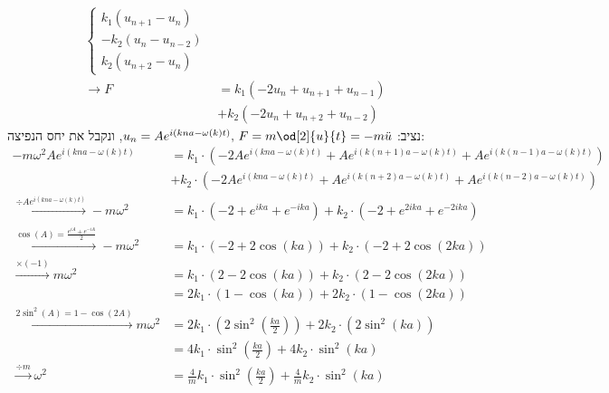 \documentclass{article}
\begin{document}
\begin{Question}
\begin{align*}
\begin{cases}
        k_{1}\left( u_{n+1}-u_{n} \right)\\
        -k_{2}\left( u_{n}-u_{n-2} \right)\\
        k_{2}\left( u_{n+2}-u_{n} \right)
    \end{cases}\\\rightarrow
    F&=
        k_{1} (- 2 u_{n} + u_{n+1} + u_{n-1})\\
        &+k_{2} (- 2 u_{n} + u_{n+2} + u_{n-2})
\end{align*}
נציב: $u_{n}=Ae^{i\left( kna-\omega(k) t \right)},\, F=m\od[2]{u}{t}=-m\ddot{u} $, ונקבל את יחס הנפיצה:
\begin{align*}
    -m\omega^{2}Ae^{i\left( kna-\omega(k) t \right)}&=
    k_{1}\cdot\left(
    -2Ae^{i\left( kna-\omega(k) t \right)}+Ae^{i\left( k(n+1)a-\omega(k) t \right)}
    +Ae^{i\left( k(n-1)a-\omega(k) t \right)}
    \right)\\
            &+
    k_{2}\cdot\left(
    -2Ae^{i\left( kna-\omega(k) t \right)}+Ae^{i\left( k(n+2)a-\omega(k) t \right)}
    +Ae^{i\left( k(n-2)a-\omega(k) t \right)}
    \right)\\
    \xrightarrow{\div Ae^{i\left( kna-\omega(k) t \right)}}-m\omega^{2}&=
    k_{1}\cdot\left( 
        -2+e^{ika}+e^{-ika}
    \right)+
    k_{2}\cdot\left( 
        -2+e^{2ika}+e^{-2ika}
    \right)\\
    \xrightarrow{\cos(A)=\frac{e^{iA}+e^{-iA}}{2}}-m\omega^{2}&=
    k_{1}\cdot\left( 
        -2+2\cos(ka)
    \right)+
    k_{2}\cdot\left( 
        -2+2\cos(2ka)
    \right)\\
    \xrightarrow{\times (-1)}m\omega^{2}&=
    k_{1}\cdot\left( 
        2-2\cos(ka)
    \right)+
    k_{2}\cdot\left( 
        2-2\cos(2ka)
    \right)\\&=
    2k_{1}\cdot\left( 
        1-\cos(ka)
    \right)+
    2k_{2}\cdot\left( 
        1-\cos(2ka)
    \right)\\
    \xrightarrow{2\sin^{2}(A)=1-\cos(2A)}m\omega^{2}&=
    2k_{1}\cdot\left( 
        2\sin^{2}\left( \frac{ka}{2} \right)
    \right)+
        2k_{2}\cdot\left( 
        2\sin^{2}\left( ka \right)
    \right)\\&=
        4k_{1}\cdot 
        \sin^{2}\left( \frac{ka}{2} \right)
    +
        4k_{2}\cdot 
        \sin^{2}\left( ka \right)\\
    \xrightarrow{\div m} \omega^{2}&=
    \frac{4}{m}k_{1}\cdot 
        \sin^{2}\left( \frac{ka}{2} \right)
    +
        \frac{4}{m}k_{2}\cdot 
        \sin^{2}\left( ka \right)\\

\end{align*}
\end{Question}
\end{document}
